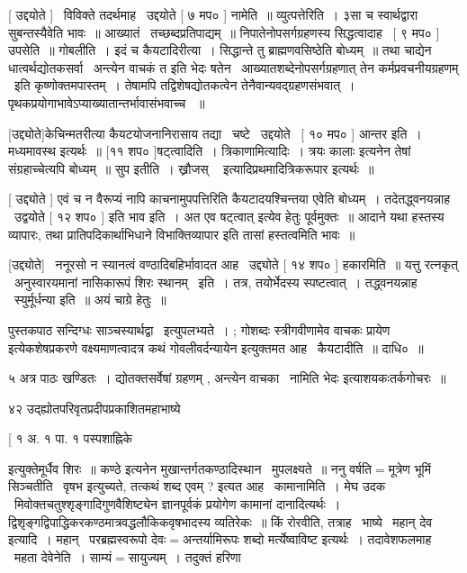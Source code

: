 \documentclass[11pt, openany]{book}
\begin{document}
 [ उद्दयोते ] \textendash\ विविक्ते तदर्थमाह \textendash\ उद्दयोते [ ७ मप० ] नामेति~॥
व्युत्पत्तेरिति~। ३सा च स्वार्थद्वारा सुबन्तस्यैवेति भावः~॥
आख्यातं \textendash\ तच्छब्दप्रतिपाद्यम्~॥ निपातेनोपसर्गग्रहणस्य सिद्धत्वादाह \textendash\ [ ९
मप० ] उपसेति~॥ गोबलीति~। इदं च कैयटादिरीत्या~। सिद्धान्ते तु
ब्राह्मणवसिष्ठेति बोध्यम्~॥ तथा चाद्येन धात्वर्थद्योतकसर्वा \textendash\ 
अन्त्येन वाचकं त इति भेदः षतेन \textendash\ {\qt आख्यातशब्देनोपसर्गग्रहणात् तेन
कर्मप्रवचनीयग्रहणम्} \textendash\ इति कृष्णोक्तमपास्तम्~। तेषामपि तद्विशेषद्योतकत्वेन
तेनैवान्यवद्ग्रहणसंभवात्~। पृथकप्रयोगाभावेऽप्याख्यातान्तर्भावासंभवाच्च
~॥ 

 [उद्द्योते]केचिन्मतरीत्या कैयटयोजनानिरासाय तद्या \textendash\ चष्टे \textendash\ 
उद्दयोते \textendash\ [ १० मप० ] आन्तर इति~। मध्यमावस्थ इत्यर्थः~॥ [११ शप०
]षट्त्वादिति~। त्रिकाणामित्यादिः~। {\qt त्रयः कालाः} इत्यनेन तेषां
संग्रहाच्चेत्यपि बोध्यम्~॥ सुप इतीति~। {\qt ख्रौजस् \textendash\ }
इत्यादिप्रथमादित्रिकरूपार इत्यर्थः~॥ 

 [ उद्द्योते ] एवं च न वैरूप्यं नापि काचनामुपपत्तिरिति
कैयटादयश्चिन्तया एवेति बोध्यम्~। तदेतद्ध्वनयन्नाह \textendash\ उद्वयोते [ १२ शप०
] इति भाव इति~। अत एव {\qt षट्त्वात्} इत्येव हेतुः पूर्वमुक्तः~॥ आदाने
यथा हस्तस्य व्यापारः, तथा प्रातिपदिकार्थाभिधाने विभाक्तिव्यापार इति
तासां हस्तत्वमिति भावः~॥ 

 [उद्द्योते] \textendash\ ननूरसो न स्यानत्वं वण्ठादिबहिर्भावादत आह \textendash\ उद्द्योते [
१४ शप० ] हकारमिति~॥ यत्तु रत्नकृत् \textendash\ अनुस्वारयमानां नासिकारूपं शिरः
स्थानम् \textendash\ इति~। तत्र, तयोर्भेदस्य स्पष्टत्वात्~। 
तद्ध्वनयन्नाह \textendash\ स्युर्मूर्धन्या इति~॥ अयं चाग्रे हेतुः~॥ 



पुस्तकपाठ सन्दिग्धः {\qt साञ्चस्यार्थद्वा} \textendash\ इत्युपलभ्यते~। ; {\qt गोशब्दः
स्त्रीगवीणामेव वाचकः प्रायेण} इत्येकशेषप्रकरणे वक्ष्यमाणत्वादत्र कथं
{\qt गोवलीवर्दन्यायेन} इत्युक्तमत आह \textendash\ कैयटादीति~॥ दाधि०~॥ 

५ अत्र पाठः खण्डितः~। {\qt द्योतक्तसर्वेषां ग्रहणम् , अन्त्येन वाचका \textendash\ 
नामिति भेदः} इत्याशयकःतर्कगोचरः~॥ 

४२ उद्ह्योतपरिवृतप्रदीपप्रकाशितमहाभाष्ये \textendash\ 

 [ १ अ. १ पा. १ पस्पशाह्निके



इत्युक्तेमूर्धैव शिरः~॥ {\qt कण्ठे} इत्यनेन मुखान्तर्गतकण्ठादिस्थान \textendash\ 
मुपलक्ष्यते~॥ ननु वर्षति$=$मूत्रेण भूमिं सिञ्चतीति \textendash\ वृषभ इत्युच्यते,
तत्कथं शब्द एवम् ? इत्यत आह \textendash\ कामानामिति~। मेघ उदक \textendash\ 
मिवोक्तचतुश्शृङ्गादिगुणवैशिष्ट्येन ज्ञानपूर्वकं प्रयोगेण कामानां
दानादित्यर्थः~। द्विशृङ्गद्विपाद्धिकरकण्ठमात्रवद्धलौकिकवृषभादस्य
व्यतिरेकः~॥ किं रोरवीति, तत्राह \textendash\ भाष्ये \textendash\ महान् देव इत्यादि~। 
महान् \textendash\ परब्रह्मस्वरूपो देवः$=$अन्तर्यामिरूपः शब्दो मर्त्येष्वाविष्ट
इत्यर्थः~। तदावेशफलमाह \textendash\ महता देवेनेति~। साम्यं$=$सायुज्यम्~। तदुक्तं
हरिणा \textendash\ 
\end{document}
